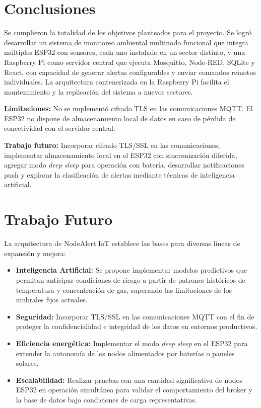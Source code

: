 \documentclass[11pt,a4paper]{article}
\begin{document}
\section{Conclusiones}

Se cumplieron la totalidad de los objetivos planteados para el proyecto. Se logr\'o desarrollar un sistema de monitoreo ambiental multinodo funcional que integra m\'ultiples ESP32 con sensores, cada uno instalado en un sector distinto, y una Raspberry Pi como servidor central que ejecuta Mosquitto, Node-RED, SQLite y React, con capacidad de generar alertas configurables y enviar comandos remotos individuales. La arquitectura contenerizada en la Raspberry Pi facilita el mantenimiento y la replicaci\'on del sistema a nuevos sectores.

\textbf{Limitaciones:} No se implement\'o cifrado TLS en las comunicaciones MQTT. El ESP32 no dispone de almacenamiento local de datos en caso de p\'erdida de conectividad con el servidor central.

\textbf{Trabajo futuro:} Incorporar cifrado TLS/SSL en las comunicaciones, implementar almacenamiento local en el ESP32 con sincronizaci\'on diferida, agregar modo \textit{deep sleep} para operaci\'on con bater\'ia, desarrollar notificaciones push y explorar la clasificaci\'on de alertas mediante t\'ecnicas de inteligencia artificial.

\section{Trabajo Futuro}
La arquitectura de NodeAlert IoT establece las bases para diversas l\'ineas de expansi\'on y mejora:

\begin{itemize}
    \item \textbf{Inteligencia Artificial:} Se propone implementar modelos predictivos que permitan anticipar condiciones de riesgo a partir de patrones hist\'oricos de temperatura y concentraci\'on de gas, superando las limitaciones de los umbrales fijos actuales.
    \item \textbf{Seguridad:} Incorporar TLS/SSL en las comunicaciones MQTT con el fin de proteger la confidencialidad e integridad de los datos en entornos productivos.
    \item \textbf{Eficiencia energ\'etica:} Implementar el modo \textit{deep sleep} en el ESP32 para extender la autonom\'ia de los nodos alimentados por bater\'ias o paneles solares.
    \item \textbf{Escalabilidad:} Realizar pruebas con una cantidad significativa de nodos ESP32 en operaci\'on simult\'anea para validar el comportamiento del broker y la base de datos bajo condiciones de carga representativas.
\end{itemize}
\end{document}
